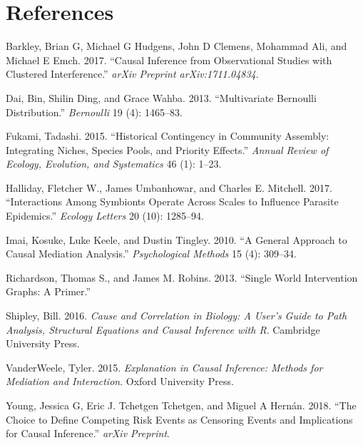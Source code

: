 \documentclass[]{article}
\begin{document}
\section*{References}\label{references}

\hypertarget{refs}{}
\hypertarget{ref-barkley2017causal}{}
Barkley, Brian G, Michael G Hudgens, John D Clemens, Mohammad Ali, and
Michael E Emch. 2017. ``Causal Inference from Observational Studies with
Clustered Interference.'' \emph{arXiv Preprint arXiv:1711.04834}.

\hypertarget{ref-dai2013multivariate}{}
Dai, Bin, Shilin Ding, and Grace Wahba. 2013. ``Multivariate Bernoulli
Distribution.'' \emph{Bernoulli} 19 (4): 1465--83.

\hypertarget{ref-fukami2015historical}{}
Fukami, Tadashi. 2015. ``Historical Contingency in Community Assembly:
Integrating Niches, Species Pools, and Priority Effects.'' \emph{Annual
Review of Ecology, Evolution, and Systematics} 46 (1): 1--23.

\hypertarget{ref-halliday2017interactions}{}
Halliday, Fletcher W., James Umbanhowar, and Charles E. Mitchell. 2017.
``Interactions Among Symbionts Operate Across Scales to Influence
Parasite Epidemics.'' \emph{Ecology Letters} 20 (10): 1285--94.

\hypertarget{ref-imai2010general}{}
Imai, Kosuke, Luke Keele, and Dustin Tingley. 2010. ``A General Approach
to Causal Mediation Analysis.'' \emph{Psychological Methods} 15 (4):
309--34.

\hypertarget{ref-richardson2013primer}{}
Richardson, Thomas S., and James M. Robins. 2013. ``Single World
Intervention Graphs: A Primer.''

\hypertarget{ref-shipley2016cause}{}
Shipley, Bill. 2016. \emph{Cause and Correlation in Biology: A User's
Guide to Path Analysis, Structural Equations and Causal Inference with
R}. Cambridge University Press.

\hypertarget{ref-vanderweele2015explanation}{}
VanderWeele, Tyler. 2015. \emph{Explanation in Causal Inference: Methods
for Mediation and Interaction}. Oxford University Press.

\hypertarget{ref-young2018the-choice}{}
Young, Jessica G, Eric J. Tchetgen Tchetgen, and Miguel A Hernán. 2018.
``The Choice to Define Competing Risk Events as Censoring Events and
Implications for Causal Inference.'' \emph{arXiv Preprint}.
\end{document}
